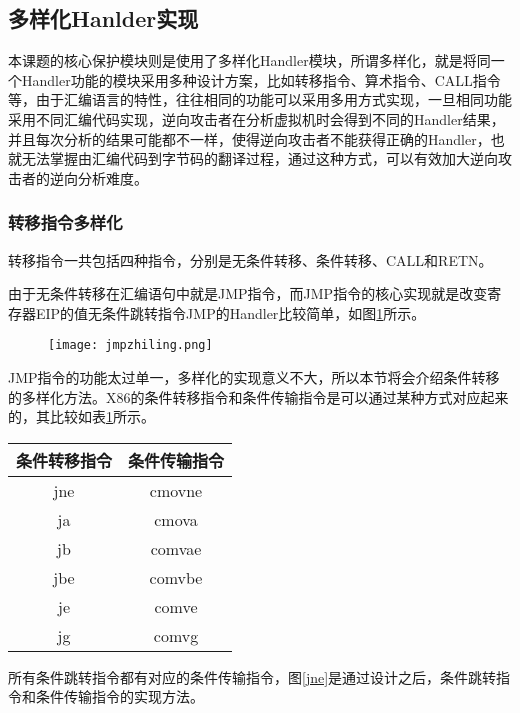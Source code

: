 \subsection{多样化Hanlder实现}

本课题的核心保护模块则是使用了多样化Handler模块，所谓多样化，就是将同一个Handler功能的模块采用多种设计方案，比如转移指令、算术指令、CALL指令等，由于汇编语言的特性，往往相同的功能可以采用多用方式实现，一旦相同功能采用不同汇编代码实现，逆向攻击者在分析虚拟机时会得到不同的Handler结果，并且每次分析的结果可能都不一样，使得逆向攻击者不能获得正确的Handler，也就无法掌握由汇编代码到字节码的翻译过程，通过这种方式，可以有效加大逆向攻击者的逆向分析难度。

\subsubsection{转移指令多样化}

转移指令一共包括四种指令，分别是无条件转移、条件转移、CALL和RETN。

由于无条件转移在汇编语句中就是JMP指令，而JMP指令的核心实现就是改变寄存器EIP的值无条件跳转指令JMP的Handler比较简单，如图\ref{jmpzhiling}所示。

\begin{figure}[htbp]
	\centering
	\texttt{[image: jmpzhiling.png]}
	\label{jmpzhiling}
\end{figure}


JMP指令的功能太过单一，多样化的实现意义不大，所以本节将会介绍条件转移的多样化方法。X86的条件转移指令和条件传输指令是可以通过某种方式对应起来的，其比较如表\ref{jmp}所示。

\begin{table}[htbp]
	\begin{tabular}{c|c}
		
		\hline
		条件转移指令 & 条件传输指令 \\ \hline
		jne    & cmovne \\ \hline
		ja     & cmova  \\ \hline
		jb     & comvae \\ \hline
		jbe    & comvbe \\ \hline
		je     & comve  \\ \hline
		jg     & comvg  \\ \hline
	\end{tabular}
	\centering

	\label{jmp}
\end{table}
所有条件跳转指令都有对应的条件传输指令，图\ref{jne}是通过设计之后，条件跳转指令和条件传输指令的实现方法。

